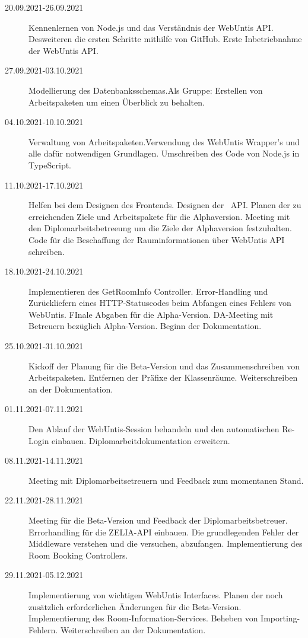 
\begin{description}
    \item[20.09.2021-26.09.2021] Kennenlernen von Node.js und das Verständnis der WebUntis API. Desweiteren die ersten Schritte mithilfe von GitHub. Erste Inbetriebnahme der WebUntis API. 
    \item[27.09.2021-03.10.2021] Modellierung des Datenbanksschemas.Als Gruppe: Erstellen von Arbeitspaketen um einen Überblick zu behalten.
    \item[04.10.2021-10.10.2021] Verwaltung von Arbeitspaketen.Verwendung des WebUntis Wrapper's und alle dafür notwendigen Grundlagen. Umschreiben des Code von Node.js in TypeScript.
    \item[11.10.2021-17.10.2021] Helfen bei dem Designen des Frontends. Designen der \ZELIA\ API. Planen der zu erreichenden Ziele und Arbeitspakete für die Alphaversion. Meeting mit den Diplomarbeitsbetreeung um die Ziele der Alphaversion festzuhalten. Code für die Beschaffung der Rauminformationen über WebUntis API schreiben. 
    \item[18.10.2021-24.10.2021] Implementieren des GetRoomInfo Controller. Error-Handling und Zurückliefern eines HTTP-Statuscodes beim Abfangen eines Fehlers von WebUntis. FInale Abgaben für die Alpha-Version. DA-Meeting mit Betreuern bezüglich Alpha-Version. Beginn der Dokumentation.
    \item[25.10.2021-31.10.2021] Kickoff der Planung für die Beta-Version und das Zusammenschreiben von Arbeitspaketen. Entfernen der Präfixe der Klassenräume. Weiterschreiben an der Dokumentation.
    \item[01.11.2021-07.11.2021] Den Ablauf der WebUntis-Session behandeln und den automatischen Re-Login einbauen. Diplomarbeitdokumentation erweitern. 
    \item[08.11.2021-14.11.2021] Meeting mit Diplomarbeitsetreuern und Feedback zum momentanen Stand.
    \item[22.11.2021-28.11.2021] Meeting für die Beta-Version und Feedback der Diplomarbeitsbetreuer. Errorhandling für die ZELIA-API einbauen. Die grundlegenden Fehler der Middleware verstehen und die versuchen, abzufangen. Implementierung des Room Booking Controllers. 
    \item[29.11.2021-05.12.2021] Implementierung von wichtigen WebUntis Interfaces. Planen der noch zusätzlich erforderlichen Änderungen für die Beta-Version. Implementierung des Room-Information-Services. Beheben von Importing-Fehlern. Weiterschreiben an der Dokumentation.

\end{description}
